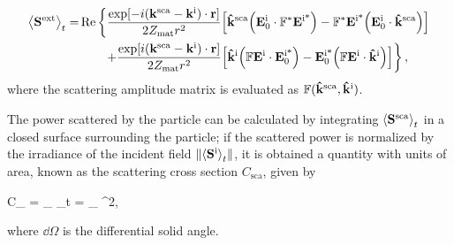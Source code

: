  \begin{align}
 \ev{\vb{S}^\text{ext}}_t = &\Re\left\{
								\frac{\exp[-i(\vb{k}^\text{sca}-\vb{k}^\text{i})\cdot\vb{r}]}{2 Z_\text{mat}r^2}
								\qty[\vu{k}^\text{sca}\qty(\vb{E}_0^\text{i}\cdot \mathbb{F}^*\vb{E}^\text{i*})
									-\mathbb{F}^*\vb{E}^\text{i*}	\qty(\vb{E}^\text{i}_0\cdot\vu{k}^\text{sca})]
							 \right.\notag	\\
							&\hspace{2em}\left.
								+\frac{\exp[i(\vb{k}^\text{sca}-\vb{k}^\text{i})\cdot\vb{r}]}{2 Z_\text{mat}r^2}
								\qty[\vu{k}^\text{i}\qty(\mathbb{F}\vb{E}^\text{i}\cdot\vb{E}^\text{i*}_0)
									-\vb{E}^\text{i*}_0 \qty(\mathbb{F}\vb{E}^\text{i}\cdot\vu{k}^\text{i})]	\right\},
 \label{eq:AvePoyntingExt}
\end{align}%
where the scattering amplitude matrix is evaluated as $\mathbb{F}(\vu{k}^\text{sca},\vu{k}^\text{i})$.

The power scattered by the particle can be calculated by integrating $\ev{\vb{S}^\text{sca}}_t$ in a closed surface surrounding the particle; if the scattered power is normalized by the irradiance of the incident field $\norm{\ev{\vb{S}^\text{i}}_t}$, it is obtained a quantity with units of area, known as the scattering cross section $C_\text{sca}$, given by \cite{bohren_absorption_1983}%
%
%
%
 \begin{tcolorbox}[title = Scattering Cross Section,	ams align, breakable]
	C_ =  \oint_ _t \cdot{}
				= \oint_ 
									{^2}\dd{\Omega},
 \label{eq:Csca}
 \end{tcolorbox}
%
\noindent
where $\dd{\Omega}$ is the differential solid angle.

